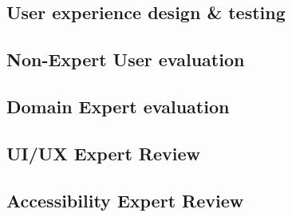 \documentclass[preview]{standalone}
\begin{document}
\subsection{User experience design \& testing}


\subsection{Non-Expert User evaluation}


\newpage
\subsection{Domain Expert evaluation}


\newpage
\subsection{UI/UX Expert Review}


\subsection{Accessibility Expert Review}

\end{document}
